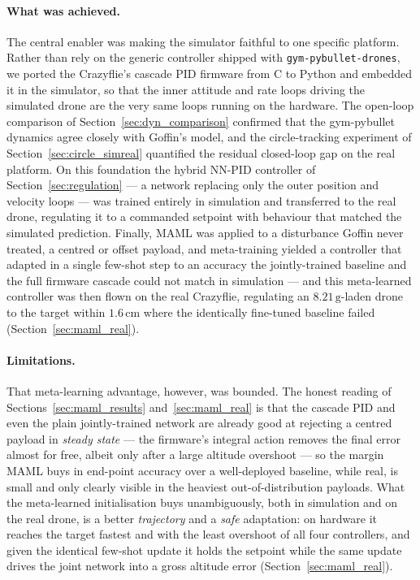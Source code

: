 \documentclass[11pt,a4paper]{article}
\theoremstyle{remark}
\numberwithin{equation}{section}
\begin{document}
\paragraph{What was achieved.}
The central enabler was making the simulator faithful to one specific platform.
Rather than rely on the generic controller shipped with
\texttt{gym-pybullet-drones}, we ported the Crazyflie's cascade PID firmware from C
to Python and embedded it in the simulator, so that the inner attitude and rate
loops driving the simulated drone are the very same loops running on the hardware.
The open-loop comparison of Section~\ref{sec:dyn_comparison} confirmed that the
gym-pybullet dynamics agree closely with Goffin's model, and the circle-tracking
experiment of Section~\ref{sec:circle_simreal} quantified the residual closed-loop
gap on the real platform. On this foundation the hybrid NN-PID controller of
Section~\ref{sec:regulation} --- a network replacing only the outer position and
velocity loops --- was trained entirely in simulation and transferred to the real
drone, regulating it to a commanded setpoint with behaviour that matched the
simulated prediction. Finally, MAML was applied to a disturbance Goffin never
treated, a centred or offset payload, and meta-training yielded a controller
that adapted in a single few-shot step to an accuracy the jointly-trained baseline
and the full firmware cascade could not match in simulation --- and this
meta-learned controller was then flown on the real Crazyflie, regulating an
$8.21\,\mathrm{g}$-laden drone to the target within $1.6\,\mathrm{cm}$ where the
identically fine-tuned baseline failed (Section~\ref{sec:maml_real}).

\paragraph{Limitations.}
That meta-learning advantage, however, was bounded. The honest reading of
Sections~\ref{sec:maml_results} and~\ref{sec:maml_real} is that the cascade PID and
even the plain jointly-trained network are already good at rejecting a centred
payload in \emph{steady state} --- the firmware's integral action removes the
final error almost for free, albeit only after a large altitude overshoot --- so
the margin MAML buys in end-point accuracy over a well-deployed baseline, while
real, is small and only clearly visible in the heaviest out-of-distribution
payloads. What the meta-learned initialisation buys unambiguously, both in
simulation and on the real drone, is a better \emph{trajectory} and a \emph{safe}
adaptation: on hardware it reaches the target fastest and with the least overshoot
of all four controllers, and given the identical few-shot update it holds the
setpoint while the same update drives the joint network into a gross altitude error
(Section~\ref{sec:maml_real}).
\end{document}
